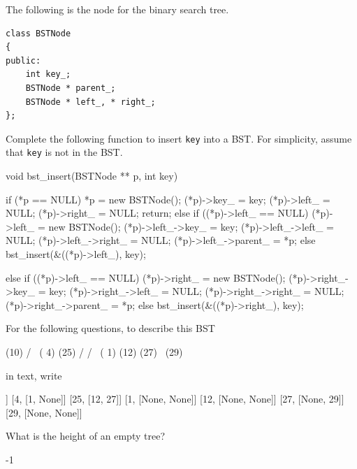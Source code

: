 

The following is the node for the binary search tree.
\begin{Verbatim}[frame=single,fontsize=\footnotesize]
class BSTNode
{
public:
    int key_;
    BSTNode * parent_;
    BSTNode * left_, * right_;
};
\end{Verbatim}

\nextq
Complete the following function to insert \verb!key! into a BST.
For simplicity, assume that \verb!key! is not in the BST.
\\
\ANSWER
\begin{answercode}
void bst_insert(BSTNode ** p, int key)
{
  if (*p == NULL)
  {
    *p = new BSTNode();
    (*p)->key_ = key;
    (*p)->left_ = NULL;
    (*p)->right_ = NULL;
    return;
  }
  else
  {
    if ((*p)->left_ == NULL)
    {
      (*p)->left_ = new BSTNode();
      (*p)->left_->key_ = key;
      (*p)->left_->left_ = NULL;
      (*p)->left_->right_ = NULL;
      (*p)->left_->parent_ = *p;
    }
    else
    {
      bst_insert(&((*p)->left_), key);
    }
  }
  
  else
  {
    if ((*p)->left_ == NULL)
    {
      (*p)->right_ = new BSTNode();
      (*p)->right_->key_ = key;
      (*p)->right_->left_ = NULL;
      (*p)->right_->right_ = NULL;
      (*p)->right_->parent_ = *p;
    }
    else
    {
      bst_insert(&((*p)->right_), key);
    }
  }
}
\end{answercode}

For the following questions,
to describe this BST
\begin{console}[fontsize=\footnotesize]
            (10)
          /      \
      ( 4)        (25)
     /           /    \
 ( 1)        (12)      (27)
                           \
                            (29)
\end{console}
in text, write
\begin{console}[fontsize=\footnotesize]
[10, [4, 25]]
[4, [1, None]]
[25, [12, 27]]
[1, [None, None]]
[12, [None, None]]
[27, [None, 29]]
[29, [None, None]]
\end{console}

\nextq
What is the height of an empty tree?
\\
\ANSWER
\begin{answercode}
-1
\end{answercode}


